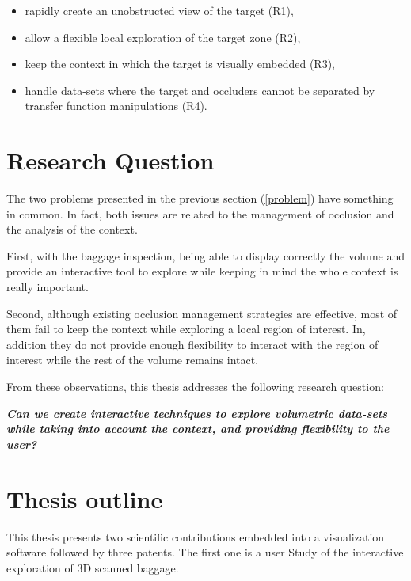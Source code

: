 \begin{itemize}

\item rapidly create an unobstructed view of the target (R1),

\item allow a flexible local exploration of the target zone (R2),

\item keep the context in which the target is visually embedded (R3),

\item handle data-sets where the target and occluders cannot 
be separated by transfer function manipulations (R4).

\end{itemize}

\section{Research Question}

The two problems presented in the previous section (\autoref{problem}) have something in common. In fact, both issues are related to the management of occlusion and the analysis of the context. 

First, with the baggage inspection, being able to display correctly the volume and provide an interactive tool to explore while keeping in mind the whole context is really important.

Second, although existing occlusion management strategies are effective, most of them fail to keep the context while exploring a local region of interest. In, addition they do not provide enough flexibility to interact with the region of interest while the rest of the volume remains intact.

From these observations, this thesis addresses the following research question: 

\textbf{\textit{
Can we create interactive techniques to explore volumetric data-sets while taking into account the context, and providing flexibility to the user? }}


\section{ Thesis outline }

This thesis presents two scientific contributions embedded into a visualization software followed by three patents. The first one is a user Study of the interactive exploration of 3D scanned baggage.

